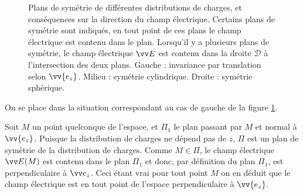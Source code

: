\documentclass[11pt,fleqn]{book} %
\begin{document}
\begin{figure}[htbp]
  
\caption{Plans de symétrie de différentes distributions de charges, et conséquences sur la direction du champ électrique. Certains plans de symétrie sont indiqués, en tout point de ces plans le champ électrique est contenu dans le plan. Lorsqu'il y a plusieurs plans de symétrie, le champ électrique $\vv E$ est contenu dans la droite $\mathcal{D}$ à l'intersection des deux plans. Gauche : invariance par translation selon $\vv{e_z}$. Milieu : symétrie cylindrique. Droite : symétrie sphérique.}
\label{fig:symetries}
\end{figure}

\begin{example}

    On se place dans la situation correspondant au cas de gauche de la figure \ref{fig:symetries}. 

Soit $M$ un point quelconque de l'espace, et $\Pi_1$ le plan passant par $M$ et normal à $\vv{e_z}$. Puisque la distribution de charges ne dépend pas de $z$, $\Pi$ est un plan de symétrie de la distribution de charges. Comme $M \in \Pi$, le champ électrique $\vv E(M)$ est contenu dans le plan $\Pi_1$ et donc, par définition du plan $\Pi_1$, est perpendiculaire à $\vv e_z$. Ceci étant vrai pour tout point $M$ on en déduit que le champ électrique est en tout point de l'espace perpendiculaire à $\vv{e_z}$. 
\end{example}
\end{document}

